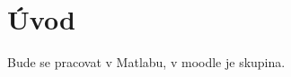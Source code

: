 \documentclass[12pt]{article}					%
\begin{document}
\section{Úvod}
    Bude se pracovat v Matlabu, v moodle je skupina.
\end{document}
